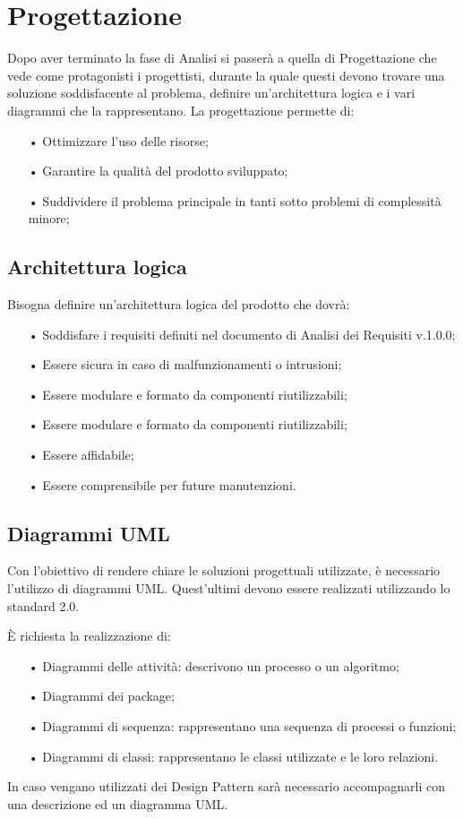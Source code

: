 \section{Progettazione}
Dopo aver terminato la fase di Analisi si passerà a quella di Progettazione che vede come protagonisti i progettisti, durante la quale questi devono trovare una soluzione soddisfacente al problema, definire un'architettura logica e i vari diagrammi che la rappresentano.
La progettazione permette di: 
\begin{itemize}
\item[•] Ottimizzare l'uso delle risorse;
\item[•] Garantire la qualità del prodotto sviluppato;
\item[•] Suddividere il problema principale in tanti sotto problemi di complessità minore;
\end{itemize}

\subsection{Architettura logica}
Bisogna definire un'architettura logica del prodotto che dovrà: 
\begin{itemize}
\item[•] Soddisfare i requisiti definiti nel documento di Analisi dei Requisiti v.1.0.0;
\item[•] Essere sicura in caso di malfunzionamenti o intrusioni;
\item[•] Essere modulare e formato da componenti riutilizzabili;
\item[•] Essere modulare e formato da componenti riutilizzabili;
\item[•] Essere affidabile;
\item[•] Essere comprensibile per future manutenzioni.
\end{itemize}
\subsection{Diagrammi UML}
Con l'obiettivo di rendere chiare le soluzioni progettuali utilizzate, è necessario l'utilizzo di {diagrammi UML}. Quest'ultimi devono essere realizzati utilizzando lo standard 2.0.

È richiesta la realizzazione di:
\begin{itemize}
\item[•] Diagrammi delle attività: descrivono un processo o un algoritmo;
\item[•] Diagrammi dei package;
\item[•] Diagrammi di sequenza: rappresentano una sequenza di processi o funzioni;
\item[•] Diagrammi di classi: rappresentano le classi utilizzate e le loro relazioni.
\end{itemize}
In caso vengano utilizzati dei Design Pattern sarà necessario accompagnarli con una descrizione ed un diagramma UML.

